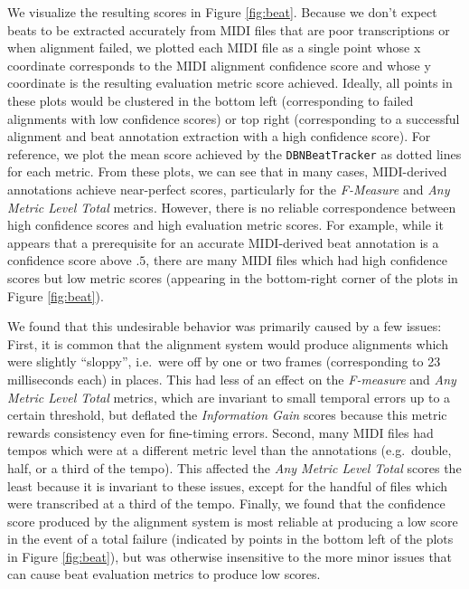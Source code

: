 \documentclass{article}
\begin{document}
We visualize the resulting scores in Figure \ref{fig:beat}.
Because we don't expect beats to be extracted accurately from MIDI files that are poor transcriptions or when alignment failed, we plotted each MIDI file as a single point whose x coordinate corresponds to the MIDI alignment confidence score and whose y coordinate is the resulting evaluation metric score achieved.
Ideally, all points in these plots would be clustered in the bottom left (corresponding to failed alignments with low confidence scores) or top right (corresponding to a successful alignment and beat annotation extraction with a high confidence score).
For reference, we plot the mean score achieved by the \texttt{DBNBeatTracker} as dotted lines for each metric.
From these plots, we can see that in many cases, MIDI-derived annotations achieve near-perfect scores, particularly for the {\em F-Measure} and {\em Any Metric Level Total} metrics.
However, there is no reliable correspondence between high confidence scores and high evaluation metric scores.
For example, while it appears that a prerequisite for an accurate MIDI-derived beat annotation is a confidence score above $.5$, there are many MIDI files which had high confidence scores but low metric scores (appearing in the bottom-right corner of the plots in Figure \ref{fig:beat}).

We found that this undesirable behavior was primarily caused by a few issues:
First, it is common that the alignment system would produce alignments which were slightly ``sloppy'', i.e.\ were off by one or two frames (corresponding to 23 milliseconds each) in places.
This had less of an effect on the {\em F-measure} and {\em Any Metric Level Total} metrics, which are invariant to small temporal errors up to a certain threshold, but deflated the {\em Information Gain} scores because this metric rewards consistency even for fine-timing errors.
Second, many MIDI files had tempos which were at a different metric level than the annotations (e.g.\ double, half, or a third of the tempo).
This affected the {\em Any Metric Level Total} scores the least because it is invariant to these issues, except for the handful of files which were transcribed at a third of the tempo.
Finally, we found that the confidence score produced by the alignment system is most reliable at producing a low score in the event of a total failure (indicated by points in the bottom left of the plots in Figure \ref{fig:beat}), but was otherwise insensitive to the more minor issues that can cause beat evaluation metrics to produce low scores.
\end{document}
